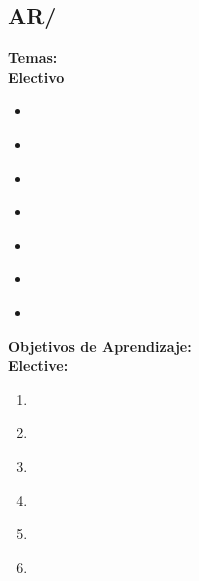 \subsection{AR/\ARPerformanceenhancements}\label{sec:BOK:ARPerformanceenhancements}
\noindent \textbf{Temas:}\\
\noindent \textbf{Electivo}
\begin{itemize}
	\item \ARPerformanceenhancementsTopicSuperscalar\label{sec:BOK:ARPerformanceenhancementsTopicSuperscalar}
	\item \ARPerformanceenhancementsTopicBranch\label{sec:BOK:ARPerformanceenhancementsTopicBranch}
	\item \ARPerformanceenhancementsTopicPrefetching\label{sec:BOK:ARPerformanceenhancementsTopicPrefetching}
	\item \ARPerformanceenhancementsTopicVector\label{sec:BOK:ARPerformanceenhancementsTopicVector}
	\item \ARPerformanceenhancementsTopicHardware\label{sec:BOK:ARPerformanceenhancementsTopicHardware}
	\item \ARPerformanceenhancementsTopicScalability\label{sec:BOK:ARPerformanceenhancementsTopicScalability}
	\item \ARPerformanceenhancementsTopicAlternative\label{sec:BOK:ARPerformanceenhancementsTopicAlternative}
\end{itemize}


\noindent \textbf{Objetivos de Aprendizaje:}\\
\noindent \textbf{Elective:}
\begin{enumerate}
	\setcounter{enumi}{0}
	\item \ARPerformanceenhancementsLODescribeSuperscalar\xspace[\ARPerformanceenhancementsLODescribeSuperscalarLevel]\label{sec:BOK:ARPerformanceenhancementsLODescribeSuperscalar}
	\item \ARPerformanceenhancementsLOExplainTheBranch\xspace[\ARPerformanceenhancementsLOExplainTheBranchLevel]\label{sec:BOK:ARPerformanceenhancementsLOExplainTheBranch}
	\item \ARPerformanceenhancementsLOCharacterize\xspace[\ARPerformanceenhancementsLOCharacterizeLevel]\label{sec:BOK:ARPerformanceenhancementsLOCharacterize}
	\item \ARPerformanceenhancementsLOExplainSpeculative\xspace[\ARPerformanceenhancementsLOExplainSpeculativeLevel]\label{sec:BOK:ARPerformanceenhancementsLOExplainSpeculative}
	\item \ARPerformanceenhancementsLODiscussTheThatIn\xspace[\ARPerformanceenhancementsLODiscussTheThatInLevel]\label{sec:BOK:ARPerformanceenhancementsLODiscussTheThatIn}
	\item \ARPerformanceenhancementsLODescribeTheScalability\xspace[\ARPerformanceenhancementsLODescribeTheScalabilityLevel]\label{sec:BOK:ARPerformanceenhancementsLODescribeTheScalability}
\end{enumerate}

